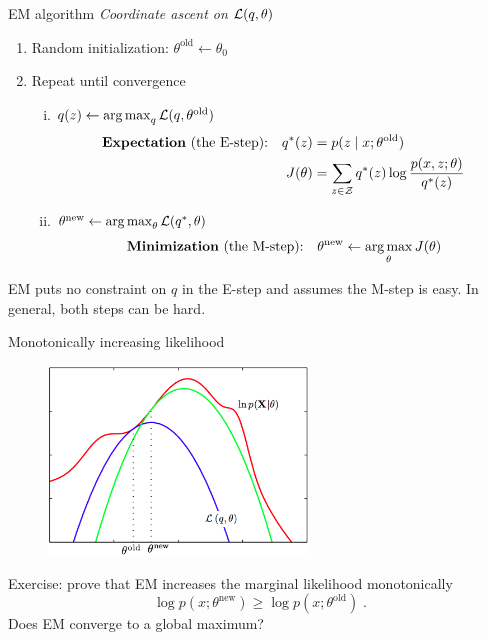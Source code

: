 \documentclass[usenames,dvipsnames,notes]{beamer}
\begin{document}
\begin{frame}
    {EM algorithm}
    \emph{Coordinate ascent on $\mathcal{L}(q, \theta)$}\\
    \begin{enumerate}
        \item Random initialization: $\theta^{\text{old}} \leftarrow \theta_0$
        \item Repeat until convergence
            \begin{enumerate}[(i)]
                \item $q(z) \leftarrow \operatorname*{arg\,max}_q \mathcal{L}(q, \theta^{\text{old}})$
                    \begin{align*}
                    \text{\textbf{Expectation} (the E-step):} \quad
                    q^*(z) &= p(z\mid x;\theta^{\text{old}}) \\
                    J(\theta) &= \sum_{z\in\mathcal{Z}} q^*(z)\log \frac{p(x,z;\theta)}{q^*(z)}
                    \end{align*}
                \item $\theta^{\text{new}} \leftarrow \operatorname*{arg\,max}_\theta \mathcal{L}(q^*, \theta)$
                    \begin{align*}
                        \text{\textbf{Minimization} (the M-step):} \quad
                        \theta^{\text{new}} \leftarrow \operatorname*{arg\,max}_\theta J(\theta)
                    \end{align*}
            \end{enumerate}
    \end{enumerate}
        EM puts no constraint on $q$ in the E-step and assumes the M-step is easy.
        In general, both steps can be hard.
\end{frame}

\begin{frame}
    {Monotonically increasing likelihood}
    \begin{figure}
        \includegraphics[height=5cm]{figures/EM-twosteps-Bishop9.14.png}
    \end{figure}
    \vspace{-2em}
    Exercise: prove that EM increases the marginal likelihood monotonically
    $$
    \log p(x;\theta^{\text{new}}) \ge \log p(x;\theta^{\text{old}})
    \;.
    $$
    Does EM converge to a global maximum?
\end{frame}
\end{document}
